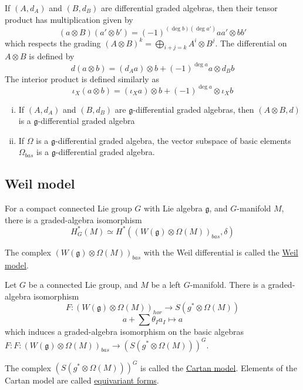 If $(A,d_A)$ and  $(B,d_B)$ are differential graded algebras, then their tensor product has
multiplication given by 
 \[
	 (a\otimes B)(a'\otimes b') = (-1)^{(\deg b)(\deg a')}aa'\otimes bb'
\] 
which respects the grading $(A\otimes B)^k = \bigoplus_{i+j= k} A^i\otimes B^j$.
The differential on $A\otimes B$ is defined by 
\[
d(a\otimes b) = (d_A a)\otimes b + (-1)^{\deg a}a\otimes d_Bb
\] 
The interior product is defined similarly as 
\[
\iota_X(a\otimes b) = (\iota_X a)\otimes b + (-1)^{\deg a}\otimes \iota_Xb
\] 
\begin{prop} %
	\begin{enumerate}[(i), leftmargin=\parindent]
	    \item 
			If $(A,d_A)$ and  $(B,d_B)$ are $\mathfrak{g}$-differential graded 
			algebras, then $(A\otimes B,d)$ is a $\mathfrak{g}$-differential graded 
			algebra
		\item 
	If $\Omega$ is a  $\mathfrak{g}$-differential graded algebra, the vector
	subspace of basic elements $\Omega_{bas}$ is a $\mathfrak{g}$-differential
	graded algebra.
	\end{enumerate}
\end{prop}

\subsection{Weil model}
\begin{thm} \label{thm:equivariant_de_Rham} %
	For a compact connected Lie group $G$ with Lie algebra $\mathfrak{g}$, and
	$G$-manifold  $M$, there is a graded-algebra isomorphism 
	 \[
		 H_G^*(M) \simeq H^*((W(\mathfrak{g})\otimes \Omega(M))_{bas}, \delta)
	\] 
\end{thm}
The complex $(W(\mathfrak{g})\otimes \Omega(M))_{bas}$ with the Weil
differential is called the \underline{Weil model}.

\begin{thm} \label{thm:weil_cartan_iso} %
	Let $G$ be a connected Lie group, and $M$ be a left $G$-manifold. There is a
	graded-algebra isomorphism 
	\[
		F : (W(\mathfrak{g})\otimes \Omega(M))_{hor} \to S(g^*\otimes \Omega(M))
	\] 
	\[
	a+ \sum \theta_I a_I \mapsto a
	\] 
	which induces a graded-algebra isomorphism on the basic algebras
	$F : F : (W(\mathfrak{g})\otimes \Omega(M))_{bas} \to (S(g^*\otimes
	\Omega(M)))^G$. 
\end{thm}
The complex $(S(g^*\otimes \Omega(M)))^G$ is called the \underline{Cartan
model}. Elements of the Cartan model are called \underline{equivariant forms}.

